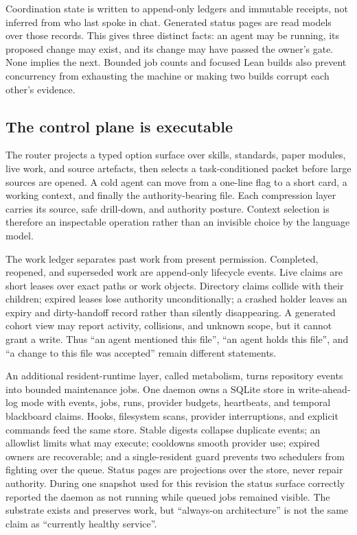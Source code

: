 \documentclass[10pt]{article}
\begin{document}
Coordination state is written to append-only ledgers and immutable receipts,
not inferred from who last spoke in chat. Generated status pages are read
models over those records. This gives three distinct facts: an agent may be
running, its proposed change may exist, and its change may have passed the
owner's gate. None implies the next. Bounded job counts and focused Lean builds
also prevent concurrency from exhausting the machine or making two builds
corrupt each other's evidence.

\subsection{The control plane is executable}

The router projects a typed option surface over skills, standards, paper
modules, live work, and source artefacts, then
selects a task-conditioned packet before large sources are opened. A cold
agent can move from a one-line flag to a short card, a working context, and
finally the authority-bearing file. Each compression layer carries its source,
safe drill-down, and authority posture. Context selection is therefore an
inspectable operation rather than an invisible choice by the language model.

The work ledger separates past work from present permission. Completed,
reopened, and superseded work are append-only lifecycle events. Live claims are
short leases over exact paths or work objects. Directory claims collide with
their children; expired leases lose authority unconditionally; a crashed
holder leaves an expiry and dirty-handoff record rather than silently
disappearing. A generated cohort view may report activity, collisions, and
unknown scope, but it cannot grant a write. Thus ``an agent mentioned this
file'', ``an agent holds this file'', and ``a change to this file was accepted''
remain different statements.

An additional resident-runtime layer, called metabolism, turns repository
events into bounded maintenance jobs. One daemon owns a SQLite store in
write-ahead-log mode with events, jobs, runs, provider budgets, heartbeats, and
temporal blackboard claims. Hooks, filesystem scans, provider interruptions,
and explicit commands feed the same store. Stable digests collapse duplicate
events; an allowlist limits what may execute; cooldowns smooth provider use;
expired owners are recoverable; and a single-resident guard prevents two
schedulers from fighting over the queue. Status pages are projections over the
store, never repair authority. During one snapshot used for this revision the
status surface correctly reported the daemon as not running while queued jobs
remained visible. The substrate exists and preserves work, but ``always-on
architecture'' is not the same claim as ``currently healthy service''.
\end{document}
